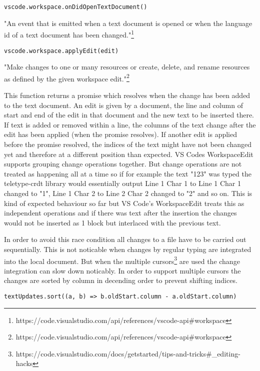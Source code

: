 \begin{lstlisting}
vscode.workspace.onDidOpenTextDocument()
\end{lstlisting}

"An event that is emitted when a text document is opened or when the language id of a text document has been changed."\footnote{https://code.visualstudio.com/api/references/vscode-api\#workspace}

\begin{lstlisting}
vscode.workspace.applyEdit(edit)
\end{lstlisting}
"Make changes to one or many resources or create, delete, and rename resources as defined by the given workspace edit."\footnote{https://code.visualstudio.com/api/references/vscode-api\#workspace}

This function returns a promise which resolves when the change has been added to the text document.
An edit is given by a document, the line and column of start and end of the edit in that document and the new text to be inserted there.
If text is added or removed within a line, the columns of the text change after the edit has been applied (when the promise resolves). If another edit is applied before the promise resolved, the indices of the text might have not been changed yet and therefore at a different position than expected. VS Codes WorkspaceEdit supports grouping change operations together. But change operations are not treated as happening all at a time so if for example the text "123" was typed the teletype-crdt library would essentially output Line 1 Char 1 to Line 1 Char 1 changed to "1", Line 1 Char 2 to Line 2 Char 2 changed to "2" and so on. This is kind of expected behaviour so far but VS Code's WorkspaceEdit treats this as independent operations and if there was text after the insertion the changes would not be inserted as 1 block but interlaced with the previous text. 

In order to avoid this race condition all changes to a file have to be carried out sequentially. This is not noticable when changes by regular typing are integrated into the local document. But when the multiple cursors\footnote{https://code.visualstudio.com/docs/getstarted/tips-and-tricks\#\_editing-hacks} are used the change integration can slow down noticably. In order to support multiple cursors the changes are sorted by column in decending order to prevent shifting indices. 
\begin{lstlisting}
textUpdates.sort((a, b) => b.oldStart.column - a.oldStart.column)
\end{lstlisting}